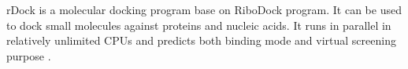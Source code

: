 rDock is a molecular docking program base on RiboDock program. It can be used to dock small molecules against proteins and nucleic acids. It runs in parallel in relatively unlimited CPUs and predicts both binding mode and virtual screening purpose \cite{1}.
